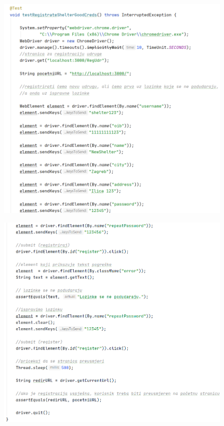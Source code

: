 			 \begin{figure}[H]
			 	\includegraphics[scale=0.75]{slike/Selenium3.1.PNG}
			 	\centering
			 \end{figure}
			 \begin{figure}[H]
			 	\includegraphics[scale=0.75]{slike/Selenium3.2.PNG} %
			 	\centering
			 \end{figure}
			 

